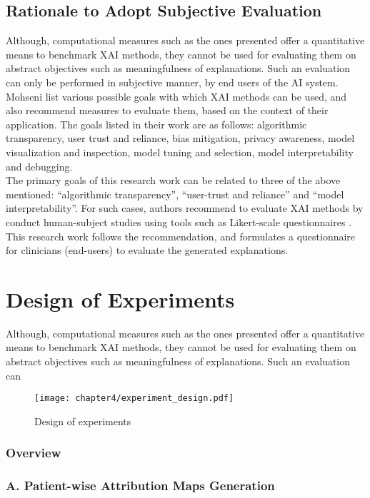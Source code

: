 \documentclass[../report.tex]{subfiles}
\begin{document}
	\subsection{Rationale to Adopt Subjective Evaluation}
	Although, computational measures such as the ones presented offer a quantitative means to benchmark XAI methods, they cannot be used for evaluating them on abstract objectives such as meaningfulness of explanations. Such an evaluation can only be performed in subjective manner, by end users of the AI system.\\
	Mohseni \etal \cite{mohseni2021multidisciplinary} list various possible goals with which XAI methods can be used, and also recommend measures to evaluate them, based on the context of their application. The goals listed in their work are as follows: algorithmic transparency, user trust and reliance, bias mitigation, privacy awareness, model visualization and inspection, model tuning and selection, model interpretability and debugging.\\ 
	The primary goals of this research work can be related to three of the above mentioned: \enquote{algorithmic transparency}, \enquote{user-trust and reliance} and \enquote{model interpretability}. For such cases, authors recommend to evaluate XAI methods by conduct human-subject studies using tools such as Likert-scale questionnaires \cite{likert_scale}. This research work follows the recommendation, and formulates a questionnaire for clinicians (end-users) to evaluate the generated explanations.
	\pagebreak
    \section{Design of Experiments}
    Although, computational measures such as the ones presented offer a quantitative means to benchmark XAI methods, they cannot be used for evaluating them on abstract objectives such as meaningfulness of explanations. Such an evaluation can
    \begin{figure}[ht]
    	\hspace*{-0.5cm}      
    	\texttt{[image: chapter4/experiment\_design.pdf]}
    	\caption{Design of experiments}
    \end{figure}
    \subsubsection{Overview}
    \subsubsection{A. Patient-wise Attribution Maps Generation}
\end{document}
